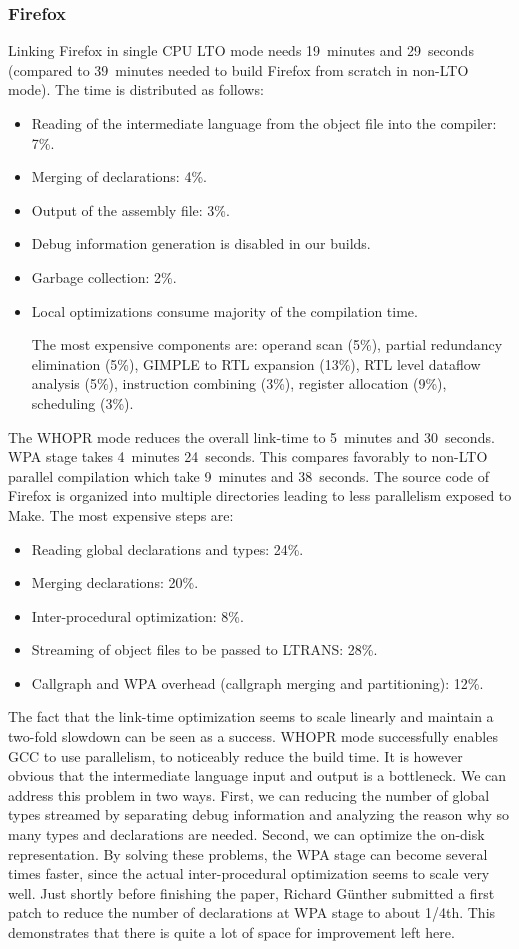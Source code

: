 \documentclass[final]{ols}
\begin{document}
\subsubsection{Firefox}

Linking Firefox in single CPU LTO mode needs 19~minutes and 29~seconds (compared to
39~minutes needed to build Firefox from scratch in non-LTO mode).
The time is distributed as follows:
\begin{itemize}
\item Reading of the intermediate language from the object file into the compiler: 7\%.
\item Merging of declarations: 4\%.
\item Output of the assembly file: 3\%.
\item Debug information generation is disabled in our builds.
\item Garbage collection: 2\%.
\item Local optimizations consume majority of the compilation time.

 The most expensive components are:
 operand scan (5\%), partial redundancy elimination (5\%), GIMPLE to RTL expansion (13\%), RTL level dataflow analysis (5\%), instruction combining (3\%),
register allocation (9\%), scheduling (3\%).
\end{itemize}

The WHOPR mode reduces the overall link-time to 5~minutes and 30~seconds. WPA stage takes
4~minutes 24~seconds. This compares favorably to non-LTO parallel compilation
which take 9~minutes and 38~seconds. The source code of Firefox is organized into
multiple directories leading to less parallelism exposed to Make.
The most expensive steps are:
\begin{itemize}
\item Reading global declarations and types: 24\%.
\item Merging declarations: 20\%.
\item Inter-procedural optimization: 8\%. 
\item Streaming of object files to be passed to LTRANS: 28\%.
\item Callgraph and WPA overhead (callgraph merging and partitioning): 12\%.
\end{itemize}

The fact that the link-time optimization seems to scale linearly and maintain
a two-fold slowdown can be seen as a success. WHOPR mode
successfully enables GCC to use parallelism, to noticeably reduce the build time.  It
is however obvious that the intermediate language input and output is a
bottleneck.  We can address this problem in two ways.  First, we can reducing
the number of global types streamed by separating debug information and analyzing the
reason why so many types and declarations are needed.  Second, we can optimize the
on-disk representation.  By solving these problems, the WPA stage can become 
several times faster, since the actual inter-procedural optimization seems to
scale very well.  Just shortly before finishing the paper, Richard G\"unther 
submitted a first patch to reduce the number of declarations at WPA stage to about 1/4th.
This demonstrates that there is quite a lot of space for improvement left here.
\end{document}
